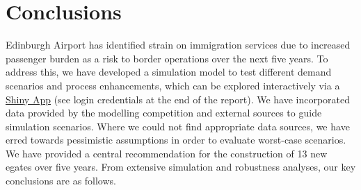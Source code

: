\documentclass[10pt]{article}
\begin{document}
\section{Conclusions}
Edinburgh Airport has identified strain on immigration services due to increased passenger burden as a risk to border operations over the next five years. To address this, we have developed a simulation model to test different demand scenarios and process enhancements, which can be explored interactively via a \href{https://jacob-bradley.shinyapps.io/shiny/}{Shiny App} (see login credentials at the end of the report). We have incorporated data provided by the modelling competition and external sources to guide simulation scenarios. Where we could not find appropriate data sources, we have erred towards pessimistic assumptions in order to evaluate worst-case scenarios. We have provided a central recommendation for the construction of 13 new \glspl{egate} over five years. From extensive simulation and robustness analyses, our key conclusions are as follows.
\end{document}
